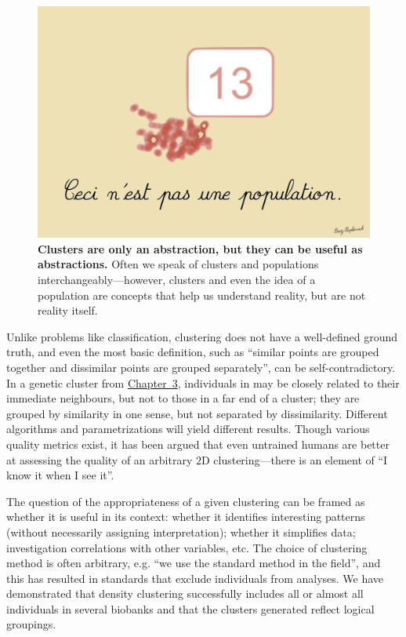 \begin{figure}[h]
\centering
    \includegraphics[width=0.75\linewidth]{main_figures/discussion/magritte.png}
\caption[The treachery of clustering]{\textbf{Clusters are only an abstraction, but they can be useful as abstractions.} Often we speak of clusters and populations interchangeably---however, clusters and even the idea of a population are concepts that help us understand reality, but are not reality itself.}
\label{fig:magritte}
\end{figure}

Unlike problems like classification, clustering does not have a well-defined ground truth, and even the most basic definition, such as ``similar points are grouped together and dissimilar points are grouped separately'', can be self-contradictory\citep{ben-david_clustering_2018}. In a genetic cluster from \hyperref[chap:chapter3]{Chapter~3}, individuals in may be closely related to their immediate neighbours, but not to those in a far end of a cluster; they are grouped by similarity in one sense, but not separated by dissimilarity. Different algorithms and parametrizations will yield different results. Though various quality metrics exist, it has been argued that even untrained humans are better at assessing the quality of an arbitrary $2$D clustering\citep{lewis_human_2012}---there is an element of ``I know it when I see it''. 

The question of the appropriateness of a given clustering can be framed as whether it is useful in its context: whether it identifies interesting patterns (without necessarily assigning interpretation); whether it simplifies data; investigation correlations with other variables, etc\citep{hennig_what_2015}. The choice of clustering method is often arbitrary, e.g. ``we use the standard method in the field''\citep{ben-david_clustering_2018}, and this has resulted in standards that exclude individuals from analyses\citep{ding_polygenic_2023}. We have demonstrated that density clustering successfully includes all or almost all individuals in several biobanks and that the clusters generated reflect logical groupings.
\citep{hennig_what_2015}

